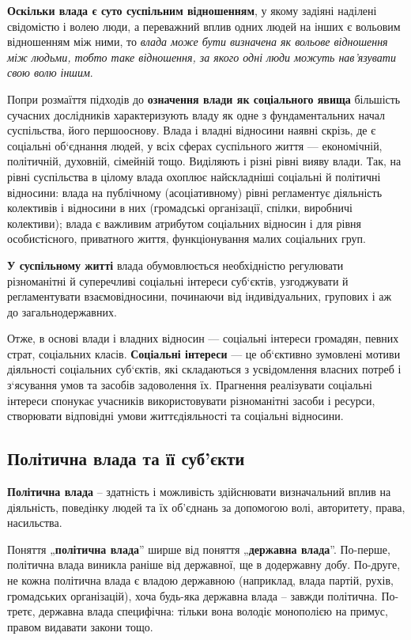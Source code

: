 \textbf{Оскільки влада є суто суспільним відношенням}, у якому задіяні наділені свідомістю і волею люди, а переважний вплив одних людей на інших є вольовим відношенням між ними, то \textit{влада може бути визначена як вольове відношення між людьми, тобто таке відношення, за якого одні люди можуть нав’язувати свою волю іншим}.

Попри розмаїття підходів до \textbf{означення влади як соціального явища} більшість сучасних дослідників характеризують владу як одне з фундаментальних начал суспільства, його першооснову. Влада і владні відносини наявні скрізь, де є соціальні об`єднання людей, у всіх сферах суспільного життя — економічній, політичній, духовній, сімейній тощо. Виділяють і різні рівні вияву влади. Так, на рівні суспільства в цілому влада охоплює найскладніші соціальні й політичні відносини: влада на публічному (асоціативному) рівні регламентує діяльність колективів і відносини в них (громадські організації, спілки, виробничі колективи); влада є важливим атрибутом соціальних відносин і для рівня особистісного, приватного життя, функціонування малих соціальних груп.

\textbf{У суспільному житті} влада обумовлюється необхідністю регулювати різноманітні й суперечливі соціальні інтереси суб`єктів, узгоджувати й регламентувати взаємовідносини, починаючи від індивідуальних, групових і аж до загальнодержавних.

Отже, в основі влади і владних відносин — соціальні інтереси громадян, певних страт, соціальних класів. \textbf{Соціальні інтереси} — це об`єктивно зумовлені мотиви діяльності соціальних суб`єктів, які складаються з усвідомлення власних потреб і з`ясування умов та засобів задоволення їх. Прагнення реалізувати соціальні інтереси спонукає учасників використовувати різноманітні засоби і ресурси, створювати відповідні умови життєдіяльності та соціальні відносини.
\subsection{Політична влада та її суб’єкти}
\textbf{Політична влада} – здатність і можливість здійснювати визначальний вплив на діяльність, поведінку людей та їх об’єднань за допомогою волі, авторитету, права, насильства.

Поняття „\textbf{політична влада}” ширше від поняття „\textbf{державна влада}”. По-перше, політична влада виникла раніше від державної, ще в додержавну добу. По-друге, не кожна політична влада є владою державною (наприклад, влада партій, рухів, громадських організацій), хоча будь-яка державна влада – завжди політична. По-третє, державна влада специфічна: тільки вона володіє монополією на примус, правом видавати закони тощо.

